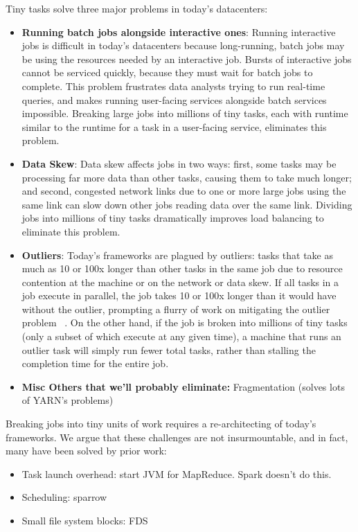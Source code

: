 Tiny tasks solve three major problems in today's datacenters:
\begin{itemize}
\item \textbf{Running batch jobs alongside interactive ones}: Running interactive
jobs is difficult in today's datacenters because long-running, batch jobs may be
using the resources needed by an interactive job. Bursts of interactive jobs
cannot be serviced quickly, because they must wait for batch jobs to complete.
This problem frustrates data analysts trying to run real-time queries, and makes
running user-facing services alongside batch services impossible. Breaking large
jobs into millions of tiny tasks, each with runtime similar to the runtime for a
task in a user-facing service, eliminates this problem.
\item \textbf{Data Skew}: Data skew affects jobs in two ways: first, some tasks
may be processing far more data than other tasks, causing them to take much
longer; and second, congested network links due to one or more large jobs using
the same link can slow down other jobs reading data over the same link. Dividing
jobs into millions of tiny tasks dramatically improves load balancing to eliminate
this problem.
\item \textbf{Outliers}: Today's frameworks are plagued by outliers: tasks that
take as much as 10 or 100x longer than other tasks in the same job due to
resource contention at the machine or on the network or data skew.  If all tasks in a job execute in parallel, the job takes 10 or 100x longer than it would
have without the outlier, prompting a flurry of work on mitigating the outlier
problem ~\cite{blah,blah,blah}. On the other hand, if the job is broken into millions of tiny tasks (only a subset of which execute at any given time), a machine
that runs an outlier task will simply run fewer total tasks, rather than
stalling the completion time for the entire job.
\item \textbf{Misc Others that we'll probably eliminate:} Fragmentation (solves
lots of YARN's problems)
\end{itemize}

Breaking jobs into tiny units of work requires a re-architecting of today's frameworks.  We argue that these challenges are not insurmountable, and in fact, many
have been solved by prior work:
\begin{itemize}
\item Task launch overhead: start JVM for MapReduce. Spark doesn't do this.
\item Scheduling: sparrow
\item Small file system blocks: FDS
\end{itemize}

